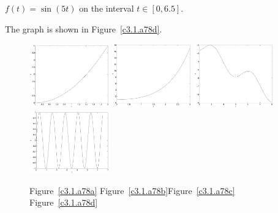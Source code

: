 \documentclass{ximera}
\begin{document}
\begin{computerExercise} \label{c3.1.a78d}
$f(t) = \sin(5t)$ on the interval $t\in [0,6.5]$.

\begin{solution}
The graph is shown in Figure~\ref{c3.1.a78d}.

\begin{figure}[htb]
                       \centerline{%
                       \includegraphics[width=1.35in]{exfigure/3-1-a78a.pdf}
                       \includegraphics[width=1.35in]{exfigure/3-1-a78b.pdf}
                       \includegraphics[width=1.35in]{exfigure/3-1-a78c.pdf}
                       \includegraphics[width=1.35in]{exfigure/3-1-a78d.pdf}}
	\centerline{Figure~\ref{c3.1.a78a}\hspace{0.8in}
	Figure~\ref{c3.1.a78b}\hspace{0.8in}Figure~\ref{c3.1.a78c}
	\hspace{0.8in}Figure~\ref{c3.1.a78d}}
\end{figure}

\end{solution}
\end{computerExercise}
\end{document}
